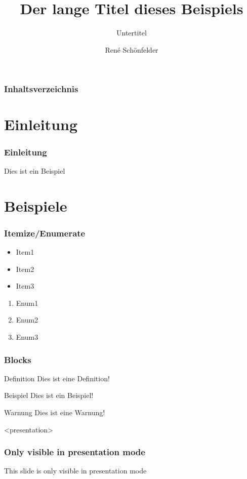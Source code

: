 \documentclass[9pt]{beamer}
\title{Der lange Titel dieses Beispiels}
\subtitle{Untertitel}
\author[R.\ Schönfelder]{Ren\'e Schönfelder}
\institute{Institut für Softwaretechnik und Programmiersprachen}
\begin{document}
\frame{\titlepage}

\begin{frame}
\frametitle<presentation>{Inhaltsverzeichnis}
\tableofcontents
\end{frame}

\section{Einleitung}

\begin{frame}
\frametitle<presentation>{Einleitung}
Dies ist ein Beispiel
\end{frame}

\section{Beispiele}

\begin{frame}
\frametitle<presentation>{Itemize/Enumerate}
\begin{itemize}
  \item Item1
  \item Item2
  \item Item3
\end{itemize}
\begin{enumerate}
  \item Enum1
  \item Enum2
  \item Enum3
\end{enumerate}
\end{frame}

\begin{frame}
\frametitle<presentation>{Blocks}
\begin{block}{Definition}
Dies ist eine Definition!
\end{block}
\begin{exampleblock}{Beispiel}
Dies ist ein Beispiel!
\end{exampleblock}
\begin{alertblock}{Warnung}
Dies ist eine Warnung!
\end{alertblock}
\end{frame}

\begin{frame}<presentation>
\frametitle{Only visible in presentation mode}
This slide is only visible in presentation mode
\end{frame}

\end{document}
